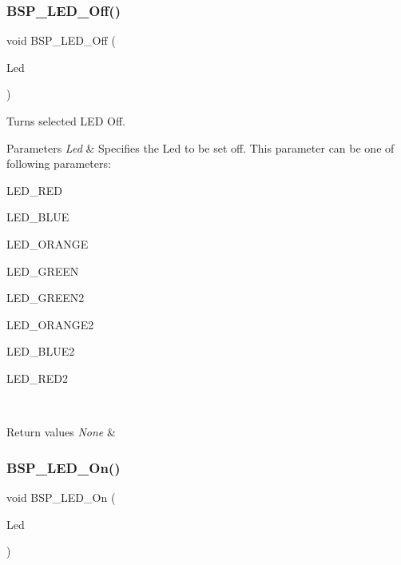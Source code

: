 \subsubsection{\texorpdfstring{B\+S\+P\+\_\+\+L\+E\+D\+\_\+\+Off()}{BSP\_LED\_Off()}}
{\footnotesize\ttfamily void B\+S\+P\+\_\+\+L\+E\+D\+\_\+\+Off (\begin{DoxyParamCaption}\item[{Led\+\_\+\+Type\+Def}]{Led }\end{DoxyParamCaption})}



Turns selected L\+ED Off. 


\begin{DoxyParams}{Parameters}
{\em Led} & Specifies the Led to be set off. This parameter can be one of following parameters\+: \begin{DoxyItemize}
\item L\+E\+D\+\_\+\+R\+ED \item L\+E\+D\+\_\+\+B\+L\+UE \item L\+E\+D\+\_\+\+O\+R\+A\+N\+GE \item L\+E\+D\+\_\+\+G\+R\+E\+EN \item L\+E\+D\+\_\+\+G\+R\+E\+E\+N2 \item L\+E\+D\+\_\+\+O\+R\+A\+N\+G\+E2 \item L\+E\+D\+\_\+\+B\+L\+U\+E2 \item L\+E\+D\+\_\+\+R\+E\+D2 \end{DoxyItemize}
\\
\hline
\end{DoxyParams}

\begin{DoxyRetVals}{Return values}
{\em None} & \\
\hline
\end{DoxyRetVals}
\mbox{\label{group__STM32F3__DISCOVERY__Exported__Functions_gae18974cf5af73c404ae48b90118826cd}} 
\subsubsection{\texorpdfstring{B\+S\+P\+\_\+\+L\+E\+D\+\_\+\+On()}{BSP\_LED\_On()}}
{\footnotesize\ttfamily void B\+S\+P\+\_\+\+L\+E\+D\+\_\+\+On (\begin{DoxyParamCaption}\item[{Led\+\_\+\+Type\+Def}]{Led }\end{DoxyParamCaption})}



